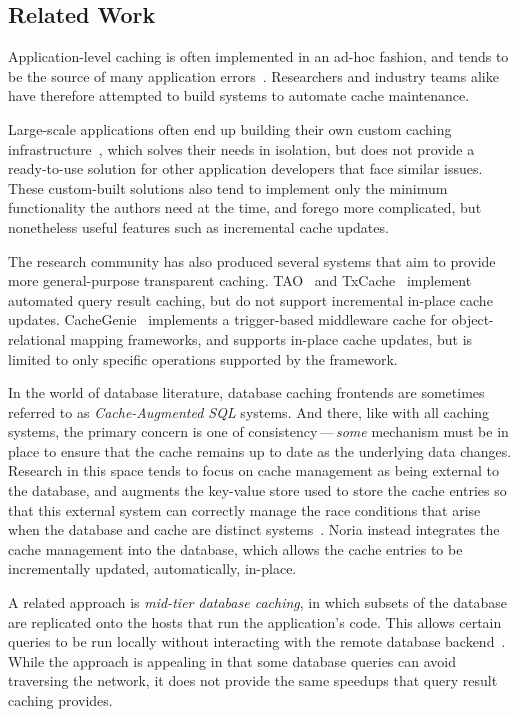 \subsection*{Related Work}

Application-level caching is often implemented in an ad-hoc fashion, and tends
to be the source of many application errors~\cite{ad-hoc-caching}. Researchers
and industry teams alike have therefore attempted to build systems to automate
cache maintenance.

Large-scale applications often end up building their own custom caching
infrastructure~\cite{facebook-memcache, flannel}, which solves their needs in
isolation, but does not provide a ready-to-use solution for other application
developers that face similar issues. These custom-built solutions also tend to
implement only the minimum functionality the authors need at the time, and
forego more complicated, but nonetheless useful features such as incremental
cache updates.

The research community has also produced several systems that aim to provide
more general-purpose transparent caching. TAO~\cite{tao} and
TxCache~\cite{txcache} implement automated query result caching, but do not
support incremental in-place cache updates. CacheGenie~\cite{cachegenie}
implements a trigger-based middleware cache for object-relational mapping
frameworks, and supports in-place cache updates, but is limited to only specific
operations supported by the framework.

In the world of database literature, database caching frontends are sometimes
referred to as \textit{Cache-Augmented SQL} systems. And there, like with all
caching systems, the primary concern is one of consistency\,---\,\emph{some}
mechanism must be in place to ensure that the cache remains up to date as the
underlying data changes. Research in this space tends to focus on cache
management as being external to the database, and augments the key-value store
used to store the cache entries so that this external system can correctly
manage the race conditions that arise when the database and cache are distinct
systems~\cite{facebook-memcache, casql-consistency, casql-consistency-thesis}.
Noria instead integrates the cache management into the database, which allows
the cache entries to be incrementally updated, automatically, in-place.

A related approach is \textit{mid-tier database caching}, in which subsets of
the database are replicated onto the hosts that run the application's code. This
allows certain queries to be run locally without interacting with the remote
database backend~\cite{mtcache}. While the approach is appealing in that some
database queries can avoid traversing the network, it does not provide the same
speedups that query result caching provides.


